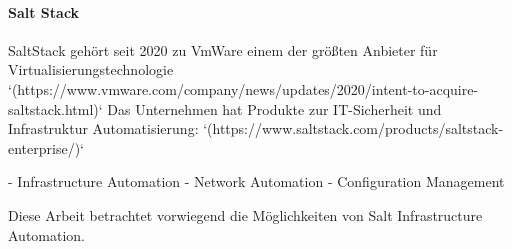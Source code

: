 \paragraph{Salt Stack}\label{iac_tools_tools_saltstack}

SaltStack gehört seit 2020 zu VmWare einem der größten Anbieter für Virtualisierungstechnologie `(https://www.vmware.com/company/news/updates/2020/intent-to-acquire-saltstack.html)`
Das Unternehmen hat Produkte zur IT-Sicherheit und Infrastruktur Automatisierung: `(https://www.saltstack.com/products/saltstack-enterprise/)`

- Infrastructure Automation
- Network Automation
- Configuration Management

Diese Arbeit betrachtet vorwiegend die Möglichkeiten von Salt Infrastructure Automation.